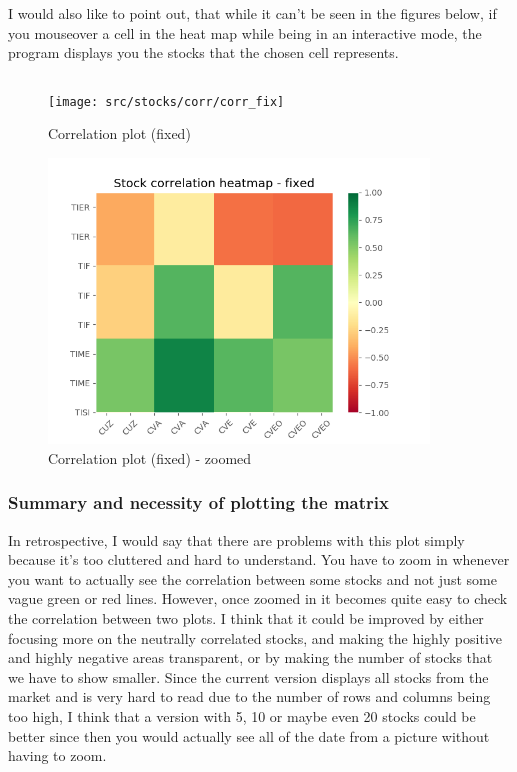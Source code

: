 \documentclass[12pt, a4paper]{article}
\begin{document}
I would also like to point out, that while it can’t be seen in the figures below, if you mouseover a cell in the heat map while being in an interactive mode, the program displays you the stocks that the chosen cell represents.

\bgroup
  \inputminted[linenos, breaklines=true, fontsize=\scriptsize, firstnumber=last]{python}{src/stocks/corr/3_fix.py}
  \label{listing:scorr_3}
\egroup

\begin{figure}[H]
    \centering
    \texttt{[image: src/stocks/corr/corr\_fix]}
    \caption{Correlation plot (fixed)}
    \label{fig:stock_corr_fix}
\end{figure}

\begin{figure}[H]
    \centering
    \includegraphics[width=0.9\textwidth]{src/stocks/corr/corr_fix_zoom}
    \caption{Correlation plot (fixed) - zoomed}
    \label{fig:stock_corr_fix_zoom}
\end{figure}

\subsubsection{Summary and necessity of plotting the matrix}

In retrospective, I would say that there are problems with this plot simply because it’s too cluttered and hard to understand. You have to zoom in whenever you want to actually see the correlation between some stocks and not just some vague green or red lines. However, once zoomed in it becomes quite easy to check the correlation between two plots. I think that it could be improved by either focusing more on the neutrally correlated stocks, and making the highly positive and highly negative areas transparent, or by making the number of stocks that we have to show smaller. Since the current version displays all stocks from the market and is very hard to read due to the number of rows and columns being too high, I think that a version with 5, 10 or maybe even 20 stocks could be better since then you would actually see all of the date from a picture without having to zoom.
\end{document}
